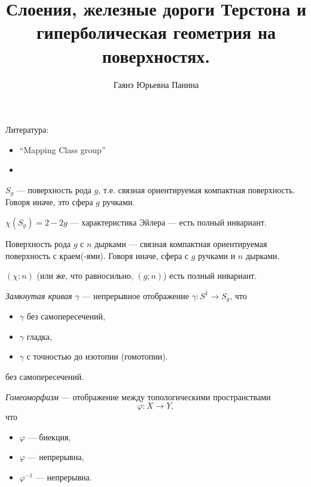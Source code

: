 \documentclass[12pt,a4paper]{article}
\title{Слоения, железные дороги Терстона и гиперболическая геометрия на поверхностях.}
\author{Гаянэ Юрьевна Панина}
\begin{document}
    \maketitle

    Литература:
    \begin{itemize}
        \item ``Mapping Class group''
        \item 
    \end{itemize}

    \begin{definition}
        $S_g$ --- поверхность рода $g$, т.е. связная ориентируемая компактная поверхность. Говоря иначе, это сфера $g$ ручками.
    \end{definition}

    \begin{lemma}
        $\chi(S_g) = 2 - 2g$ --- характеристика Эйлера --- есть полный инвариант.
    \end{lemma}

    \begin{definition}
        Поверхность рода $g$ с $n$ дырками --- связная компактная ориентируемая поверхность с краем(-ями). Говоря иначе, сфера с $g$ ручками и $n$ дырками.
    \end{definition}

    \begin{lemma}
        $(\chi; n)$ (или же, что равносильно, $(g; n)$) есть полный инвариант.
    \end{lemma}

    \begin{definition}
        \emph{Замкнутая кривая $\gamma$} --- непрерывное отображение $\gamma: S^1 \to S_g$, что
        \begin{itemize}
            \item $\gamma$ без самопересечений,
            \item $\gamma$ гладка,
            \item $\gamma$ с точностью до изотопии (гомотопии).
        \end{itemize} без самопересечений.
    \end{definition}

    \begin{definition}
        \emph{Гомеоморфизм} --- отображение между топологическими пространствами
        \[\varphi: X \to Y,\]
        что
        \begin{itemize}
            \item $\varphi$ --- биекция,
            \item $\varphi$ --- непрерывна,
            \item $\varphi^{-1}$ --- непрерывна.
        \end{itemize}
    \end{definition}
\end{document}
